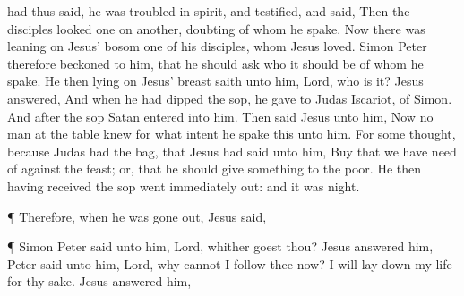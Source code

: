 {had
thus
said, he was
troubled in
spirit,
and
testified,
and
said,
{}
Then the
disciples
looked
one on
another,
doubting
of
whom he
spake.
Now there
was
leaning
on
Jesus’
bosom
one of
his
disciples,
whom
Jesus
loved.
Simon
Peter
therefore
beckoned to
him, that he should
ask
who it should
be
of
whom he
spake.
He
then
lying
on
Jesus’
breast
saith unto
him,
Lord,
who is
it?
Jesus
answered,
{}
And when he had
dipped the
sop, he
gave
{} to
Judas
Iscariot,
{} of
Simon.
And
after the
sop
Satan
entered
into
him.
Then
said
Jesus unto
him,
{}
Now no
man at the
table
knew for what
intent he
spake
this unto
him.
For
some
{}
thought,
because
Judas
had the
bag,
that
Jesus had
said unto
him,
Buy
{}
that we
have
need of
against the
feast;
or,
that he should
give
something to the
poor.
He
then having
received the
sop
went
immediately
out:
and it
was
night.
\par }{\PP {}¶
Therefore,
when he was gone
out,
Jesus
said,
{}
\par }{\PP {}¶
Simon
Peter
said unto
him,
Lord,
whither goest
thou?
Jesus
answered
him,
{}
Peter
said unto
him,
Lord,
why cannot
I
follow
thee
now? I will lay
down
my
life
for thy
sake.
Jesus
answered
him,
{}

}
